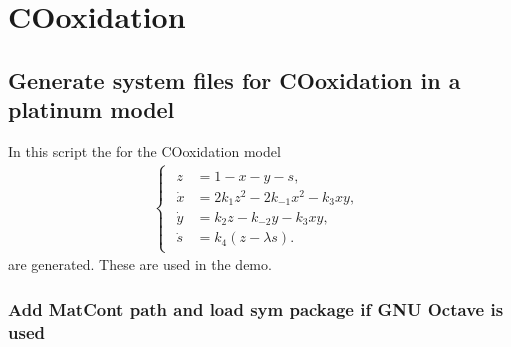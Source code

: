 \documentclass[letterpaper,10pt,english]{jupyterBook}
\begin{document}
\part{CO\sphinxhyphen{}oxidation}


\chapter{Generate system files for CO\sphinxhyphen{}oxidation in a platinum model}
\label{\detokenize{CO-oxidationGenSym:generate-system-files-for-co-oxidation-in-a-platinum-model}}\label{\detokenize{CO-oxidationGenSym::doc}}
\sphinxAtStartPar
In this script the  for the CO\sphinxhyphen{}oxidation model
\begin{equation*}
\begin{split}
\begin{cases}
\begin{aligned}
z &= 1 - x - y - s, \\
\dot x &= 2k_1z^2 - 2k_{-1}x^2 - k_3xy, \\
\dot y &= k_2z - k_{-2}y - k_3xy, \\
\dot s &= k_4(z - \lambda s).
\end{aligned}
\end{cases}
\end{split}
\end{equation*}
\sphinxAtStartPar
are generated. These are used in the {\hyperref[\detokenize{CO-oxidation::doc}]{}}
demo.


\section{Add MatCont path and load sym package if GNU Octave is used}
\label{\detokenize{CO-oxidationGenSym:add-matcont-path-and-load-sym-package-if-gnu-octave-is-used}}
\begin{sphinxVerbatim}[commandchars=\\\{\}]
\PYG{p}{[}\PYG{p}{]}
\end{sphinxVerbatim}
\end{document}

